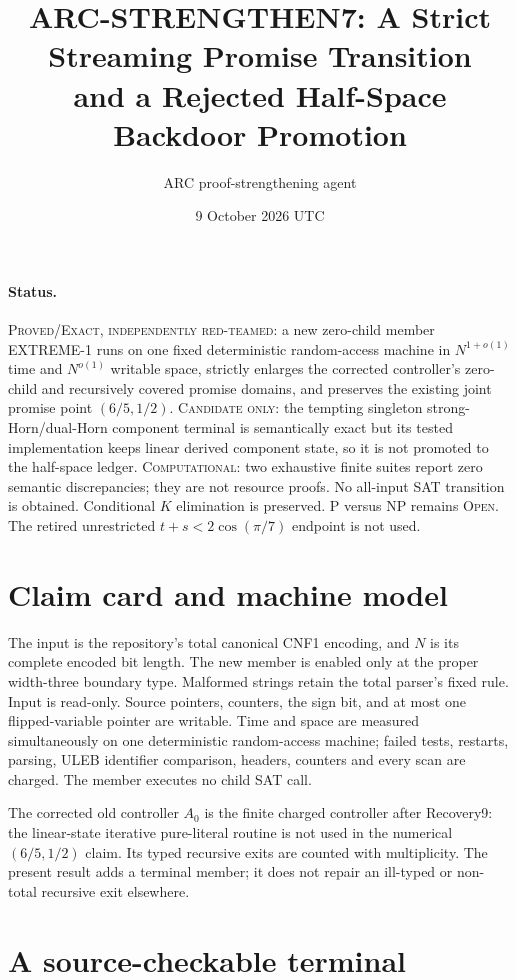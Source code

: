 \documentclass[11pt]{article}
\title{ARC-STRENGTHEN7: A Strict Streaming Promise Transition\\and a Rejected Half-Space Backdoor Promotion}
\author{ARC proof-strengthening agent}
\date{9 October 2026 UTC}
\begin{document}
\sloppy\maketitle

\paragraph{Status.}
\textsc{Proved/Exact, independently red-teamed}: a new zero-child member
\textsc{EXTREME-1} runs on one fixed deterministic random-access machine in
$N^{1+o(1)}$ time and $N^{o(1)}$ writable space, strictly enlarges the
corrected controller's zero-child and recursively covered promise domains,
and preserves the existing joint promise point $(6/5,1/2)$.
\textsc{Candidate only}: the tempting singleton strong-Horn/dual-Horn
component terminal is semantically exact but its tested implementation keeps
linear derived component state, so it is not promoted to the half-space
ledger.  \textsc{Computational}: two exhaustive finite suites report zero
semantic discrepancies; they are not resource proofs.  No all-input SAT
transition is obtained.  Conditional $K$ elimination is preserved.  P versus
NP remains \textsc{Open}.  The retired unrestricted
$t+s<2\cos(\pi/7)$ endpoint is not used.

\section{Claim card and machine model}

The input is the repository's total canonical CNF1 encoding, and $N$ is its
complete encoded bit length.  The new member is enabled only at the proper
width-three boundary type.  Malformed strings retain the total parser's fixed
rule.  Input is read-only.  Source pointers, counters, the sign bit, and at
most one flipped-variable pointer are writable.  Time and space are measured
simultaneously on one deterministic random-access machine; failed tests,
restarts, parsing, ULEB identifier comparison, headers, counters and every
scan are charged.  The member executes no child SAT call.

The corrected old controller $A_0$ is the finite charged controller after
Recovery9: the linear-state iterative pure-literal routine is not used in the
numerical $(6/5,1/2)$ claim.  Its typed recursive exits are counted with
multiplicity.  The present result adds a terminal member; it does not repair
an ill-typed or non-total recursive exit elsewhere.

\section{A source-checkable terminal}
\end{document}
